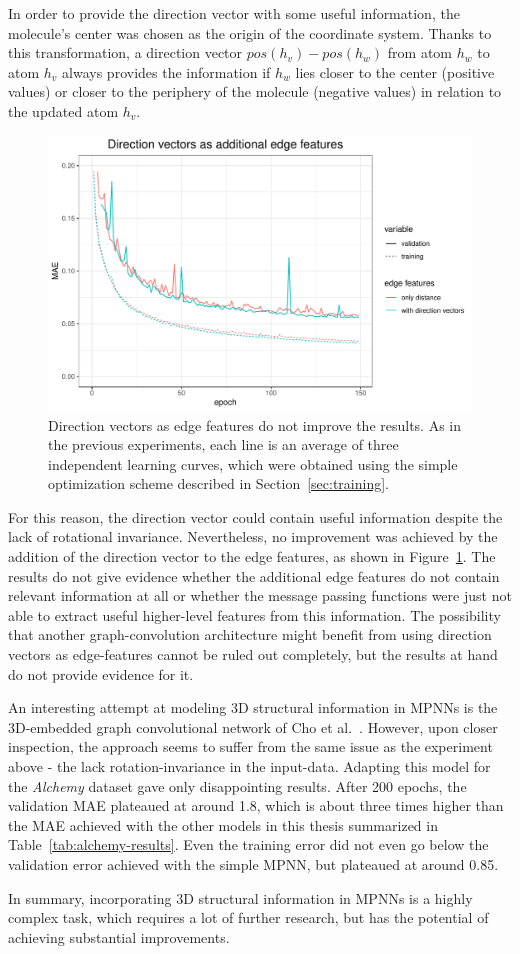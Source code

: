 In order to provide the direction vector with some useful information, the molecule's center was chosen as the origin of the coordinate system. Thanks to this transformation, a direction vector $pos(h_v) - pos(h_w)$ from atom $h_w$ to atom $h_v$ always provides the information if $h_w$ lies closer to the center (positive values) or closer to the periphery of the molecule (negative values) in relation to the updated atom $h_v$.

\begin{figure}[H]
	\includegraphics[width=\linewidth]{figures/edge-direction-vectors}
	\caption{Direction vectors as edge features do not improve the results. As in the previous experiments, each line is an average of three independent learning curves, which were obtained using the simple optimization scheme described in Section~\ref{sec:training}.}
	\label{fig:edge-direction-vectors}
\end{figure}

For this reason, the direction vector could contain useful information despite the lack of rotational invariance. Nevertheless, no improvement was achieved by the addition of the direction vector to the edge features, as shown in Figure~\ref{fig:edge-direction-vectors}. The results do not give evidence whether the additional edge features do not contain relevant information at all or whether the message passing functions were just not able to extract useful higher-level features from this information. The possibility that another graph-convolution architecture might benefit from using direction vectors as edge-features cannot be ruled out completely, but the results at hand do not provide evidence for it.

An interesting attempt at modeling 3D structural information in MPNNs is the 3D-embedded graph convolutional network of Cho et al.~\cite{Cho2018}. However, upon closer inspection, the approach seems to suffer from the same issue as the experiment above - the lack rotation-invariance in the input-data. Adapting this model for the \textit{Alchemy} dataset gave only disappointing results. After 200 epochs, the validation MAE plateaued at around 1.8, which is about three times higher than the MAE achieved with the other models in this thesis summarized in Table~\ref{tab:alchemy-results}. Even the training error did not even go below the validation error achieved with the simple MPNN, but plateaued at around 0.85.

In summary, incorporating 3D structural information in MPNNs is a highly complex task, which requires a lot of further research, but has the potential of achieving substantial improvements.






